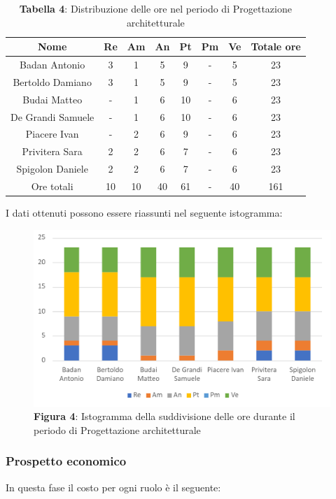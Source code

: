 \begin{table}[H]
	\centering
	\renewcommand{\arraystretch}{1.5}
	\begin{tabular}{|c|c|c|c|c|c|c|c|}
		\hline
		\rowcolor{lighter-grayer}
		Nome & Re & Am & An & Pt & Pm & Ve & Totale ore\\
		\hline
		Badan Antonio & 3 & 1 & 5 &  9 & - & 5 & 23 \\
		\hline
		Bertoldo Damiano & 3 & 1 & 5 & 9 & - & 5 & 23 \\
		\hline
		Budai Matteo & - & 1 & 6 & 10 & - & 6 & 23 \\
		\hline
		De Grandi Samuele & - & 1 & 6 & 10 & - & 6 & 23 \\
		\hline
		Piacere Ivan & - & 2 & 6 & 9 & - & 6 & 23 \\
		\hline
		Privitera Sara & 2 & 2 & 6 & 7 & - & 6 & 23 \\
		\hline
		Spigolon Daniele & 2 & 2 & 6 & 7 & - & 6 & 23 \\
		\hline
		Ore totali & 10 & 10 & 40 & 61 & - & 40 & 161 \\
		\hline
	\end{tabular}
	\caption*{\textbf{Tabella 4}: Distribuzione delle ore nel periodo di Progettazione architetturale\\}
\end{table}	
I dati ottenuti possono essere riassunti nel seguente istogramma:

\begin{figure}[H]
	\centering
	\includegraphics[width=0.7\linewidth]{res/images/IstogrammaFase2.png}
	\caption*{\textbf{Figura 4}: Istogramma della suddivisione delle ore durante il periodo di Progettazione architetturale}
	\label{fig:Figura10}
\end{figure}


\subsubsection{Prospetto economico}
In questa fase il costo per ogni ruolo è il seguente:

